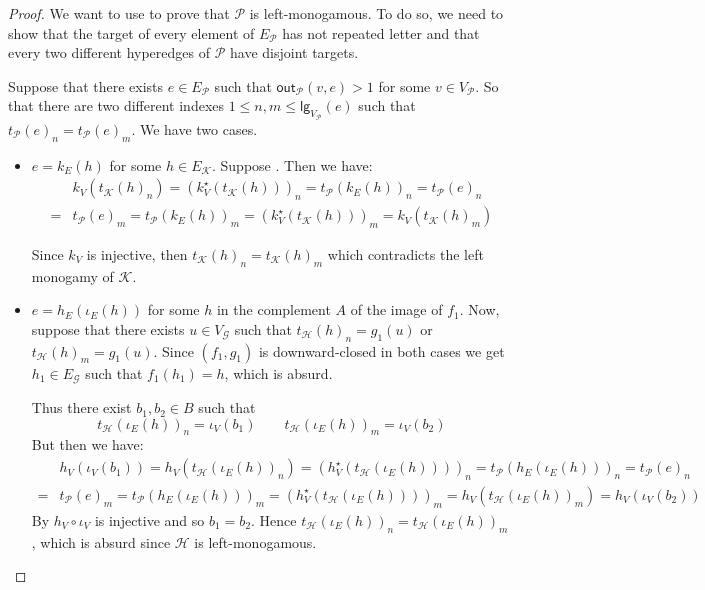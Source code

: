 \documentclass[3p]{elsarticle}
\newcommand{\lgh}{\mathsf{lg}}
\newcommand{\outd}[1]{\mathsf{out}_{\mathcal{#1}}}
\theoremstyle{remark}
\theoremstyle{definition}
\begin{document}
\begin{proof}
We want to use  to prove that $\mathcal{P}$ is left-monogamous. To do so, we need to show that the target of every element of $E_{\mathcal{P}}$ has not repeated letter and that every two different hyperedges of $\mathcal{P}$ have disjoint targets.

Suppose that there exists $e \in E_{\mathcal{P}}$ such that $\outd{P}(v,e) > 1$ for some $v\in V_{\mathcal{P}}$. So that there are two different  indexes $1\leq n, m \leq \lgh_{V_{\mathcal{P}}}(e)$ such that $t_{\mathcal{P}}(e)_n=t_{\mathcal{P}}(e)_m$. We have two cases.
\begin{itemize}
	\item $e= k_E(h)$ for some $h\in E_{\mathcal{K}}$.  Suppose . Then we have:
	\begin{align*}
		&k_V(t_{\mathcal{K}}(h)_n)=(k^\star_V(t_{\mathcal{K}}(h)))_n=t_{\mathcal{P}}(k_E(h))_n=t_{\mathcal{P}}(e)_n \\=& t_{\mathcal{P}}(e)_m = t_{\mathcal{P}}(k_E(h))_m=(k^\star_V(t_{\mathcal{K}}(h)))_m = k_V(t_{\mathcal{K}}(h)_m)	\end{align*}
	
	Since $k_V$ is injective, then $t_{\mathcal{K}}(h)_n=t_{\mathcal{K}}(h)_m$ which contradicts the left monogamy of $\mathcal{K}$.
	
	\item $e=h_E(\iota_E(h))$ for some $h$ in the complement $A$ of the image of $f_1$.  Now, suppose that there exists $u \in V_{\mathcal{G}}$ such that $t_{\mathcal{H}}(h)_n = g_1(u) $ or $t_{\mathcal{H}}(h)_m = g_1(u)$. Since $(f_1, g_1)$ is downward-closed in both cases we get $h_1\in E_{\mathcal{G}}$ such that $f_1(h_1)=h$, which is absurd. 
	
	Thus there exist $b_1, b_2\in B$ such that
	\[t_{\mathcal{H}}(\iota_E(h))_n = \iota_V(b_1) \qquad  t_{\mathcal{H}}(\iota_E(h))_m = \iota_V(b_2)\] 
	But then we have:
	\begin{align*}
		&h_V(\iota_V(b_1))=h_V(t_{\mathcal{H}}(\iota_E(h))_n)=(h^\star_V(t_{\mathcal{H}}(\iota_E(h))))_n=t_{\mathcal{P}}(h_E(\iota_E(h)))_n=t_{\mathcal{P}}(e)_n\\=&t_{\mathcal{P}}(e)_m=t_{\mathcal{P}}(h_E(\iota_E(h)))_m=(h^\star_V(t_{\mathcal{H}}(\iota_E(h))))_m=h_V(t_{\mathcal{H}}(\iota_E(h))_m)=	h_V(\iota_V(b_2))
	\end{align*}
	By  $h_V\circ \iota_V$ is injective and so $b_1 = b_2$. Hence $t_{\mathcal{H}}(\iota_E(h))_n =t_{\mathcal{H}}(\iota_E(h))_m $, which is absurd since $\mathcal{H}$ is left-monogamous.
\end{itemize}
 

\end{proof}
\end{document}
